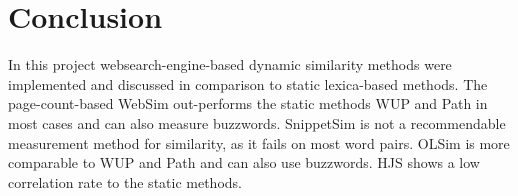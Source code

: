\documentclass[conference]{IEEEtran}
\begin{document}
\section{Conclusion}\label{sec:conclusion}

In this project websearch-engine-based dynamic similarity methods were implemented and discussed in comparison to static lexica-based methods. The page-count-based WebSim out-performs the static methods WUP and Path in most cases and can also measure buzzwords. SnippetSim is not a recommendable measurement method for similarity, as it fails on most word pairs. OLSim is more comparable to WUP and Path and can also use buzzwords. HJS shows a low correlation rate to the static methods.

 

\end{document}
